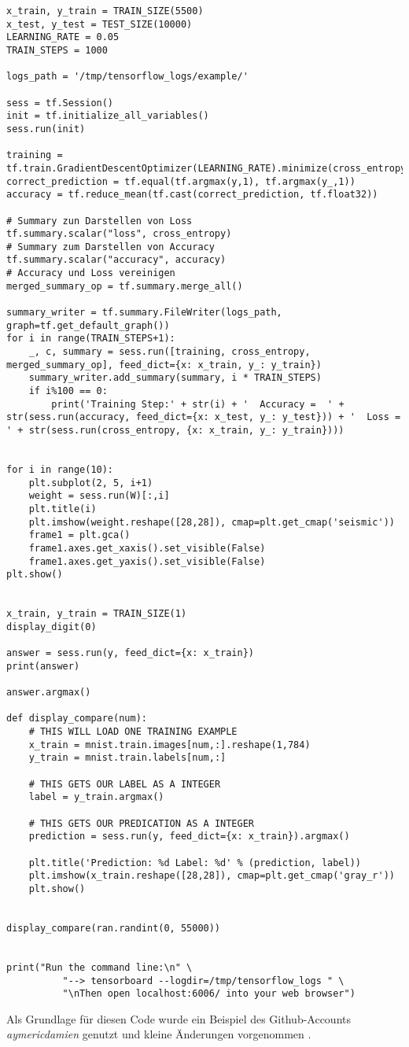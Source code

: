 \begin{lstlisting}
x_train, y_train = TRAIN_SIZE(5500)
x_test, y_test = TEST_SIZE(10000)
LEARNING_RATE = 0.05
TRAIN_STEPS = 1000

logs_path = '/tmp/tensorflow_logs/example/'

sess = tf.Session()
init = tf.initialize_all_variables()
sess.run(init)

training = tf.train.GradientDescentOptimizer(LEARNING_RATE).minimize(cross_entropy)
correct_prediction = tf.equal(tf.argmax(y,1), tf.argmax(y_,1))
accuracy = tf.reduce_mean(tf.cast(correct_prediction, tf.float32))

# Summary zun Darstellen von Loss
tf.summary.scalar("loss", cross_entropy)
# Summary zum Darstellen von Accuracy
tf.summary.scalar("accuracy", accuracy)
# Accuracy und Loss vereinigen
merged_summary_op = tf.summary.merge_all()

summary_writer = tf.summary.FileWriter(logs_path, graph=tf.get_default_graph())
for i in range(TRAIN_STEPS+1):
    _, c, summary = sess.run([training, cross_entropy, merged_summary_op], feed_dict={x: x_train, y_: y_train})
    summary_writer.add_summary(summary, i * TRAIN_STEPS)
    if i%100 == 0:
        print('Training Step:' + str(i) + '  Accuracy =  ' + str(sess.run(accuracy, feed_dict={x: x_test, y_: y_test})) + '  Loss = ' + str(sess.run(cross_entropy, {x: x_train, y_: y_train})))
    

for i in range(10):
    plt.subplot(2, 5, i+1)
    weight = sess.run(W)[:,i]
    plt.title(i)
    plt.imshow(weight.reshape([28,28]), cmap=plt.get_cmap('seismic'))
    frame1 = plt.gca()
    frame1.axes.get_xaxis().set_visible(False)
    frame1.axes.get_yaxis().set_visible(False) 
plt.show()


x_train, y_train = TRAIN_SIZE(1) 
display_digit(0)

answer = sess.run(y, feed_dict={x: x_train})
print(answer)

answer.argmax()

def display_compare(num):
    # THIS WILL LOAD ONE TRAINING EXAMPLE
    x_train = mnist.train.images[num,:].reshape(1,784)
    y_train = mnist.train.labels[num,:]
    
    # THIS GETS OUR LABEL AS A INTEGER
    label = y_train.argmax()
    
    # THIS GETS OUR PREDICATION AS A INTEGER
    prediction = sess.run(y, feed_dict={x: x_train}).argmax() 
    
    plt.title('Prediction: %d Label: %d' % (prediction, label))
    plt.imshow(x_train.reshape([28,28]), cmap=plt.get_cmap('gray_r'))
    plt.show()
    

display_compare(ran.randint(0, 55000))


print("Run the command line:\n" \
          "--> tensorboard --logdir=/tmp/tensorflow_logs " \
          "\nThen open localhost:6006/ into your web browser")
\end{lstlisting}
Als Grundlage für diesen Code wurde ein Beispiel des Github-Accounts \textit{aymericdamien} genutzt und kleine Änderungen vorgenommen \citep{Demonstrator}. 



